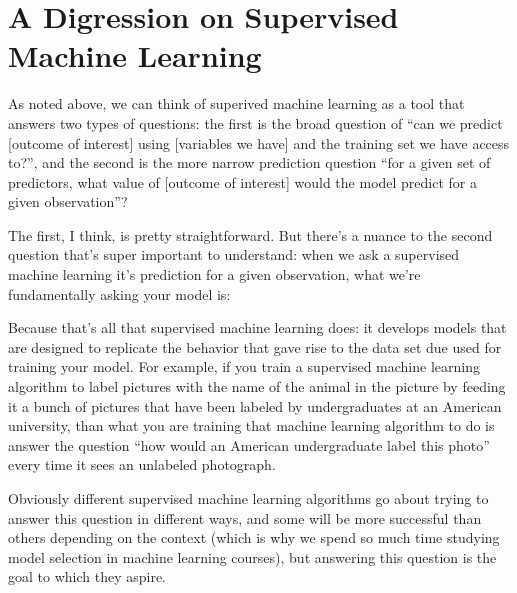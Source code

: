 \documentclass[letterpaper,10pt,english]{jupyterBook}
\begin{document}
\section{A Digression on Supervised Machine Learning}
\label{\detokenize{40_in_practice/05_backwards_design:a-digression-on-supervised-machine-learning}}
\sphinxAtStartPar
As noted above, we can think of superived machine learning as a tool that answers two types of questions: the first is the broad question of “can we predict {[}outcome of interest{]} using {[}variables we have{]} and the training set we have access to?”, and the second is the more narrow prediction question “for a given set of predictors, what value of {[}outcome of interest{]} would the model predict for a given observation”?

\sphinxAtStartPar
The first, I think, is pretty straightforward. But there’s a nuance to the second question that’s super important to understand: when we ask a supervised machine learning it’s prediction for a given observation, what we’re fundamentally asking your model is: 

\sphinxAtStartPar
Because that’s all that supervised machine learning does: it develops models that are designed to replicate the behavior that gave rise to the data set due used for training your model. For example, if you train a supervised machine learning algorithm to label pictures with the name of the animal in the picture by feeding it a bunch of pictures that have been labeled by undergraduates at an American university, than what you are training that machine learning algorithm to do is answer the question “how would an American undergraduate label this photo” every time it sees an unlabeled photograph.

\sphinxAtStartPar
Obviously different supervised machine learning algorithms go about trying to answer this question in different ways, and some will be more successful than others depending on the context (which is why we spend so much time studying model selection in machine learning courses), but answering this question is  the goal to which they aspire.
\end{document}
